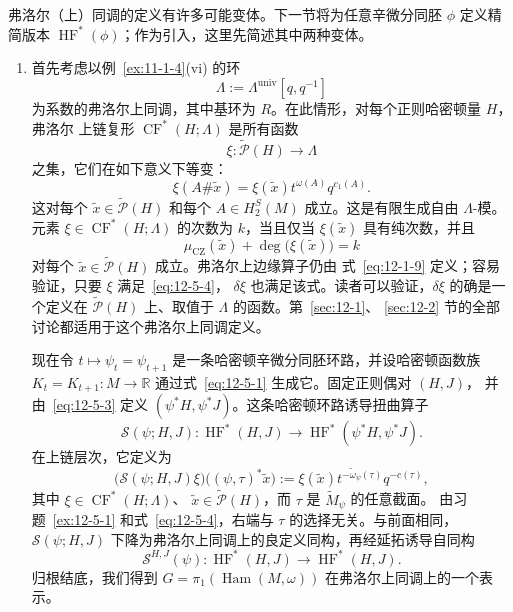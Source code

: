 \begin{remark}\label{rem:12-5-5}
弗洛尔（上）同调的定义有许多可能变体。下一节将为任意辛微分同胚 $\phi$ 定义精简版本
$\operatorname{HF}^*(\phi)$；作为引入，这里先简述其中两种变体。

\begin{enumerate}[label=(\roman*)]
\item 首先考虑以例~\ref{ex:11-1-4}(vi) 的环
\[
  \Lambda:=\Lambda^{\mathrm{univ}}[q,q^{-1}]
\]
为系数的弗洛尔上同调，其中基环为 $R$。在此情形，对每个正则哈密顿量 $H$，弗洛尔
上链复形 $\operatorname{CF}^*(H;\Lambda)$ 是所有函数
\[
  \xi:\widetilde{\mathcal P}(H)\longrightarrow\Lambda
\]
之集，它们在如下意义下等变：
\begin{equation}\label{eq:12-5-4}
  \xi(A\#\widetilde x)
  =\xi(\widetilde x)t^{\omega(A)}q^{c_1(A)}.
\end{equation}
这对每个 $\widetilde x\in\widetilde{\mathcal P}(H)$ 和每个
$A\in H_2^S(M)$
成立。这是有限生成自由 $\Lambda$-模。元素
$\xi\in\operatorname{CF}^*(H;\Lambda)$ 的次数为 $k$，当且仅当
$\xi(\widetilde x)$ 具有纯次数，并且
\[
  \mu_{\mathrm{CZ}}(\widetilde x)
  +\deg\bigl(\xi(\widetilde x)\bigr)=k
\]
对每个 $\widetilde x\in\widetilde{\mathcal P}(H)$ 成立。弗洛尔上边缘算子仍由
式~\eqref{eq:12-1-9} 定义；容易验证，只要 $\xi$ 满足~\eqref{eq:12-5-4}，
$\delta\xi$ 也满足该式。读者可以验证，$\delta\xi$ 的确是一个定义在
$\widetilde{\mathcal P}(H)$ 上、取值于 $\Lambda$ 的函数。第~\ref{sec:12-1}、
\ref{sec:12-2} 节的全部讨论都适用于这个弗洛尔上同调定义。

现在令 $t\mapsto\psi_t=\psi_{t+1}$ 是一条哈密顿辛微分同胚环路，并设哈密顿函数族
$K_t=K_{t+1}:M\to\mathbb R$ 通过式~\eqref{eq:12-5-1} 生成它。固定正则偶对 $(H,J)$，
并由~\eqref{eq:12-5-3} 定义 $(\psi^*H,\psi^*J)$。这条哈密顿环路诱导扭曲算子
\[
  \mathcal S(\psi;H,J):
  \operatorname{HF}^*(H,J)
  \longrightarrow\operatorname{HF}^*(\psi^*H,\psi^*J).
\]
在上链层次，它定义为
\[
  \bigl(\mathcal S(\psi;H,J)\xi\bigr)
  \bigl((\psi,\tau)^*\widetilde x\bigr)
  :=\xi(\widetilde x)
  t^{-\widetilde\omega_\psi(\tau)}q^{-c(\tau)},
\]
其中 $\xi\in\operatorname{CF}^*(H;\Lambda)$、
$\widetilde x\in\widetilde{\mathcal P}(H)$，而 $\tau$ 是 $\widetilde M_\psi$ 的任意截面。
由习题~\ref{ex:12-5-1} 和式~\eqref{eq:12-5-4}，右端与 $\tau$ 的选择无关。与前面相同，
$\mathcal S(\psi;H,J)$ 下降为弗洛尔上同调上的良定义同构，再经延拓诱导自同构
\[
  \mathcal S^{H,J}(\psi):
  \operatorname{HF}^*(H,J)\longrightarrow\operatorname{HF}^*(H,J).
\]
归根结底，我们得到 $G=\pi_1(\operatorname{Ham}(M,\omega))$ 在弗洛尔上同调上的一个表示。


\end{enumerate}
\end{remark}
